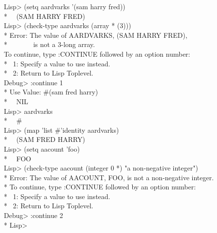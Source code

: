 \begin{defmac}
\begin{lisp}
Lisp> (setq aardvarks '(sam harry fred)) \\*
~\EV\ (SAM HARRY FRED) \\
Lisp> (check-type aardvarks (array * (3))) \\*
Error: The value of AARDVARKS, (SAM HARRY FRED), \\*
~~~~~~~is not a 3-long array. \\
To continue, type :CONTINUE followed by an option number: \\*
~1: Specify a value to use instead. \\*
~2: Return to Lisp Toplevel. \\
Debug> :continue 1 \\*
Use Value: \#(sam fred harry) \\*
~\EV\ NIL \\
Lisp> aardvarks \\*
~\EV\ \#<ARRAY-3 13571> \\
Lisp> (map 'list \#'identity aardvarks) \\*
~\EV\ (SAM FRED HARRY) \\
Lisp> (setq aacount 'foo) \\*
~\EV\ FOO \\
Lisp> (check-type aacount (integer 0 *) "a non-negative integer") \\*
Error: The value of AACOUNT, FOO, is not a non-negative integer. \\*
To continue, type :CONTINUE followed by an option number: \\*
~1: Specify a value to use instead. \\*
~2: Return to Lisp Toplevel. \\
Debug> :continue 2 \\*
Lisp> 
\end{lisp}
\end{defmac}


